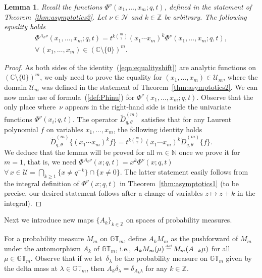 \documentclass[pdftex]{sigma}
\numberwithin{equation}{section}
\newcommand\myeq{\mathrel{\stackrel{\makebox[0pt]{\mbox{\normalfont\tiny def}}}{=}}}
\newtheorem{lem}[thm]{Lemma}
\newcommand{\C}{\mathbb{C}}
\newcommand{\Z}{\mathbb{Z}}
\newcommand{\N}{\mathbb{N}}
\newcommand{\U}{\mathcal{U}}
\newcommand{\Nu}{\mathcal{N}}
\newcommand{\GT}{\mathbb{GT}}
\begin{document}
\begin{lem}\label{lem:Akfunctions}
Recall the functions $\Phi^{\nu}(x_1, \dots, x_m; q, t)$, defined in the statement of Theorem~{\rm \ref{thm:asymptotics2}}. Let $\nu\in\Nu$ and $k\in\Z$ be arbitrary. The following equality holds
\begin{gather}
\Phi^{A_k\nu}(x_1, \dots, x_m; q, t) = t^{k{m \choose 2}}(x_1\cdots x_m)^k \Phi^{\nu}(x_1, \dots, x_m; q, t), \nonumber\\ \forall\, (x_1, \dots, x_m)\in (\C\setminus\{0\})^m.\label{eqn:equalityshift}
\end{gather}
\end{lem}
\begin{proof}
As both sides of the identity~(\ref{eqn:equalityshift}) are analytic functions on $ (\C\setminus\{0\} )^m$, we only need to prove the equality for $(x_1, \dots, x_m)\in\U_m$, where the domain $\U_m$ was def\/ined in the statement of Theorem~\ref{thm:asymptotics2}. We can now make use of formula~(\ref{def:Phinu}) for $\Phi^{\nu}(x_1, \dots, x_m; q, t)$. Observe that the only place where~$\nu$ appears in the right-hand side is inside the univariate functions $\Phi^{\nu}(x_i; q, t)$. The operator $\widetilde{D}_{q, \theta}^{(m)}$ satisf\/ies that for any Laurent polynomial $f$ on variables $x_1, \dots, x_m$, the following identity holds
\[
\widetilde{D}_{q, \theta}^{(m)} \big\{ (x_1\cdots x_m)^k f \big\} = t^{k {m \choose 2}} (x_1 \cdots x_m)^k \widetilde{D}_{q, \theta}^{(m)} \{f\}.
\]
We deduce that the lemma will be proved for all $m\in\N$ once we prove it for $m = 1$, that is, we need $\Phi^{A_k\nu}(x; q, t) = x^k \Phi^{\nu}(x; q, t)$ $\forall \, x\in \U = \bigcap\limits_{k\geq 1}{\{x \neq q^{-k}\}}\cap\{x \neq 0\}$. The latter statement easily follows from the integral def\/inition of $\Phi^{\nu}(x; q, t)$ in Theorem~\ref{thm:asymptotics1} (to be precise, our desired statement follows after a change of variables $z\mapsto z+k$ in the integral).
\end{proof}

Next we introduce new maps $\{A_k\}_{k\in\Z}$ on spaces of probability measures.

For a probability measure $M_m$ on $\GT_m$, def\/ine $A_k M_m$ as the pushforward of $M_m$ under the automorphism $A_k$ of $\GT_m$, i.e., $A_k M_m (\mu) \myeq M_m(A_{-k}\mu)$ for all $\mu\in\GT_m$. Observe that if we let~$\delta_{\lambda}$ be the probability measure on $\GT_m$ given by the delta mass at $\lambda\in\GT_m$, then $A_k \delta_{\lambda} = \delta_{A_k\lambda}$ for any $k\in\Z$.
\end{document}
